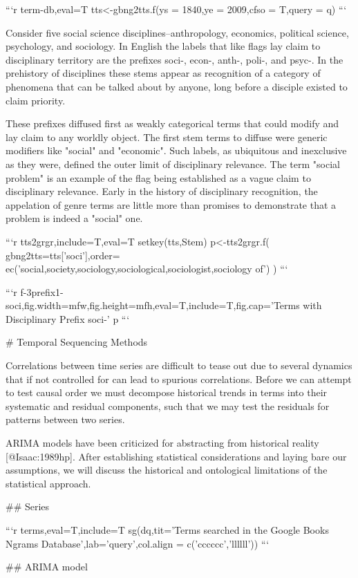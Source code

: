 \documentclass{article}
\begin{document}
```{r term-db,eval=T}
tts<-gbng2tts.f(ys = 1840,ye = 2009,cfso = T,query = q)
```


Consider five social science disciplines--anthropology, economics, political science, psychology, and sociology. In English the labels that like flags lay claim to disciplinary territory are the prefixes soci-, econ-, anth-, poli-, and psyc-. In the prehistory of disciplines these stems appear as recognition of a category of phenomena that can be talked about by anyone, long before a disciple existed to claim priority.

These prefixes diffused first as weakly categorical terms that could modify and lay claim to any worldly object. The first stem terms to diffuse were generic modifiers like "social" and "economic". Such labels, as ubiquitous and inexclusive as they were, defined the outer limit of disciplinary relevance. The term "social problem" is an example of the flag being established as a vague claim to disciplinary relevance. Early in the history of disciplinary recognition, the appelation of genre terms are little more than promises to demonstrate that a problem is indeed a "social" one.


```{r tts2grgr,include=T,eval=T}
setkey(tts,Stem)
p<-tts2grgr.f(
  gbng2tts=tts['soci'],order=
    ec('social,society,sociology,sociological,sociologist,sociology of')
)
```

```{r f-3prefix1-soci,fig.width=mfw,fig.height=mfh,eval=T,include=T,fig.cap='Terms with Disciplinary Prefix soci-'}
p
```

# Temporal Sequencing Methods

Correlations between time series are difficult to tease out due to several dynamics that if not controlled for can lead to spurious correlations. Before we can attempt to test causal order we must decompose historical trends in terms into their systematic and residual components, such that we may test the residuals for patterns between two series.

ARIMA models have been criticized for abstracting from historical reality [@Isaac:1989hp]. After establishing statistical considerations and laying bare our assumptions, we will discuss the historical and ontological limitations of the statistical approach.

## Series


```{r terms,eval=T,include=T}
sg(dq,tit='Terms searched in the Google Books Ngrams Database',lab='query',col.align = c('cccccc','llllll'))
```


## ARIMA model
\end{document}
